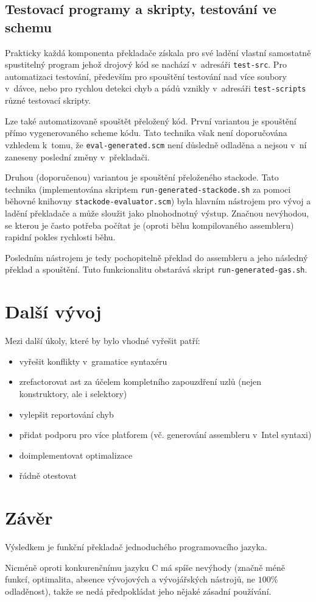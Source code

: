 \documentclass[a4paper,10pt]{article}
\begin{document}
\subsection{Testovací programy a skripty, testování ve schemu}
Prakticky každá komponenta překladače získala pro své ladění vlastní samostatně spustitelný program jehož drojový kód se nachází v~adresáři \verb|test-src|. Pro automatizaci testování, především pro spouštění testování nad více soubory v~dávce, nebo pro rychlou detekci chyb a pádů vznikly v~adresáři \verb|test-scripts| různé testovací skripty. 

Lze také automatizovaně spouštět přeložený kód. První variantou je spouštění přímo vygenerovaného scheme kódu. Tato technika však není doporučována vzhledem k~tomu, že  \verb|eval-generated.scm| není důsledně odladěna a nejsou v~ní zaneseny poslední změny v~překladači.

Druhou (doporučenou) variantou je spouštění přeloženého stackode. Tato technika (implementována skriptem \verb|run-generated-stackode.sh| za pomoci běhovné knihovny \verb|stackode-evaluator.scm|) byla hlavním nástrojem pro vývoj a ladění překladače a může sloužit jako plnohodnotný výstup. Značnou nevýhodou, se kterou je často potřeba počítat je (oproti běhu kompilovaného assembleru) rapidní pokles rychlosti běhu.

Posledním nástrojem je tedy pochopitelně překlad do assembleru a jeho následný překlad a spouštění. Tuto funkcionalitu obstarává skript \verb|run-generated-gas.sh|.

\section{Další vývoj}
Mezi další úkoly, které by bylo vhodné vyřešit patří:
\begin{itemize}
 \item vyřešit konflikty v~gramatice syntaxéru
 \item zrefactorovat ast za účelem kompletního zapouzdření uzlů (nejen konstruktory, ale i selektory)
 \item vylepšit reportování chyb
 \item přidat podporu pro více platforem (vč. generování assembleru v~Intel syntaxi)
  \item doimplementovat optimalizace
 \item řádně otestovat
\end{itemize}

\section{Závěr}
Výsledkem je funkční překladač jednoduchého programovacího jazyka. 

Nicméně oproti konkurenčnímu jazyku C má spíše nevýhody (značně méně funkcí, optimalita, absence vývojových a vývojářských nástrojů, ne $100\%$ odladěnost), takže se nedá předpokládat jeho nějaké zásadní používání.
\end{document}
